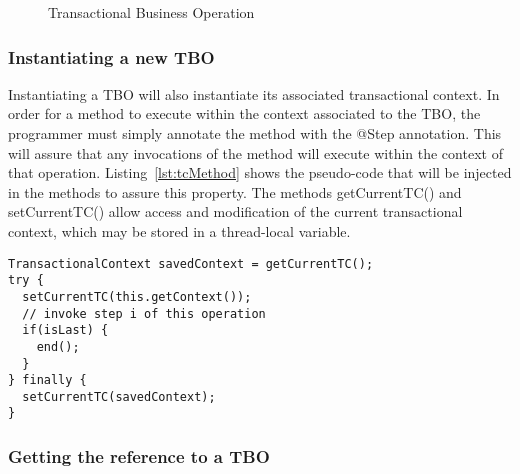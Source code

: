 \documentclass{llncs}
\begin{document}
\begin{figure}
  \centering

\caption{Transactional Business Operation}
\label{fig:TBO}

\end{figure}

\subsubsection{Instantiating a new TBO}

Instantiating a TBO will also instantiate its associated transactional
context. In order for a method to execute within the context
associated to the TBO, the programmer must simply annotate the method
with the @Step annotation. This will assure that any invocations of
the method will execute within the context of that
operation. Listing~\ref{lst:tcMethod} shows the pseudo-code that will
be injected in the methods to assure this property. The methods
getCurrentTC() and setCurrentTC() allow access and modification of the
current transactional context, which may be stored in a thread-local
variable.

\begin{lstlisting}[float]
TransactionalContext savedContext = getCurrentTC();
try {
  setCurrentTC(this.getContext());
  // invoke step i of this operation
  if(isLast) {
    end();
  }
} finally {
  setCurrentTC(savedContext);
}
\end{lstlisting}

\subsubsection{Getting the reference to a TBO}
\end{document}
